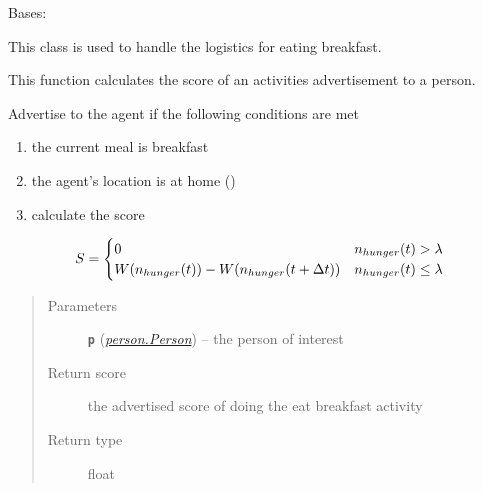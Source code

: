 \documentclass[letterpaper,10pt,english]{sphinxmanual}
\begin{document}

\begin{fulllineitems}
\label{eat:eat.Eat_Breakfast}
Bases: {\hyperref[eat:eat.Eat]{\emph{}}}

This class is used to handle the logistics for eating breakfast.

\begin{fulllineitems}
\label{eat:eat.Eat_Breakfast.advertise}
This function calculates the score of an activities advertisement to a person.

Advertise to the agent if the following conditions are met
\begin{enumerate}
\item {} 
the current meal is breakfast

\item {} 
the agent's location is at home ()

\item {} 
calculate the score

\end{enumerate}
\begin{gather}
\begin{split}S = \begin{cases}
0  & n_{hunger}(t) > \lambda \\
W( n_{hunger}(t) ) - W( n_{hunger}(t + \Delta{t} )) & n_{hunger}(t) \le \lambda
\end{cases}\end{split}\notag
\end{gather}\begin{quote}\begin{description}
\item[{Parameters}] \leavevmode
\textbf{\texttt{p}} ({\hyperref[person:person.Person]{\emph{\emph{person.Person}}}}) -- the person of interest

\item[{Return score}] \leavevmode
the advertised score of doing the eat breakfast activity

\item[{Return type}] \leavevmode
float

\end{description}\end{quote}

\end{fulllineitems}


\end{fulllineitems}
\end{document}
